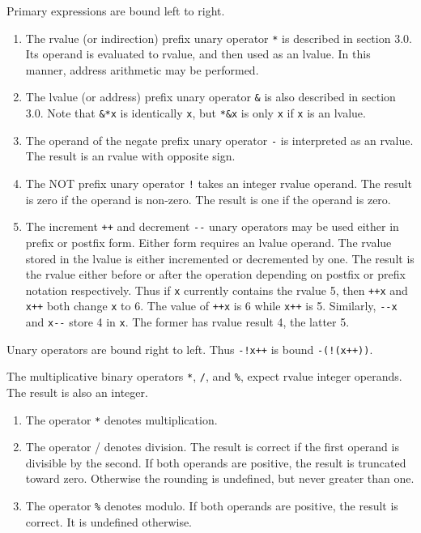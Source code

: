 \documentclass[12pt]{report}
\begin{document}
Primary expressions are bound left to right.


\begin{enumerate}
\item The rvalue (or indirection) prefix unary operator \verb|*| is
  described in section 3.0.  Its operand is evaluated to rvalue, and
  then used as an lvalue.  In this manner, address arithmetic may be
  performed.
\item The lvalue (or address) prefix unary operator \verb|&| is also
  described in section 3.0.  Note that \verb|&*x| is identically
  \verb|x|, but \verb|*&x| is only \verb|x| if \verb|x| is an lvalue.
\item The operand of the negate prefix unary operator \verb|-| is
  interpreted as an rvalue. The result is an rvalue with
  opposite sign.
\item The NOT prefix unary operator \verb|!| takes an integer rvalue
  operand.  The result is zero if the operand is non-zero.  The result
  is one if the operand is zero.
\item The increment \verb|++| and decrement \verb|--| unary operators
  may be used either in prefix or postfix form.  Either form requires
  an lvalue operand.  The rvalue stored in the lvalue is either
  incremented or decremented by one.  The result is the rvalue either
  before or after the operation depending on postfix or prefix
  notation respectively.  Thus if \verb|x| currently contains the
  rvalue 5, then \verb|++x| and \verb|x++| both change \verb|x| to 6.
  The value of \verb|++x| is 6 while \verb|x++| is 5. Similarly,
  \verb|--x| and \verb|x--| store 4 in \verb|x|. The former has rvalue
  result 4, the latter 5.
\end{enumerate}

Unary operators are bound right to left.  Thus \verb|-!x++| is bound
\verb|-(!(x++))|.


The multiplicative binary operators \verb|*|, \verb|/|, and \verb|%|,
expect rvalue integer operands.  The result is also an integer.

\begin{enumerate}
\item The operator \verb|*| denotes multiplication.
\item The operator / denotes division.  The result is correct if the
  first operand is divisible by the second.  If both operands are
  positive, the result is truncated toward zero.  Otherwise the
  rounding is undefined, but never greater than one.
\item The operator \verb|%| denotes modulo.  If both operands are
  positive, the result is correct. It is
  undefined otherwise.
\end{enumerate}
\end{document}
